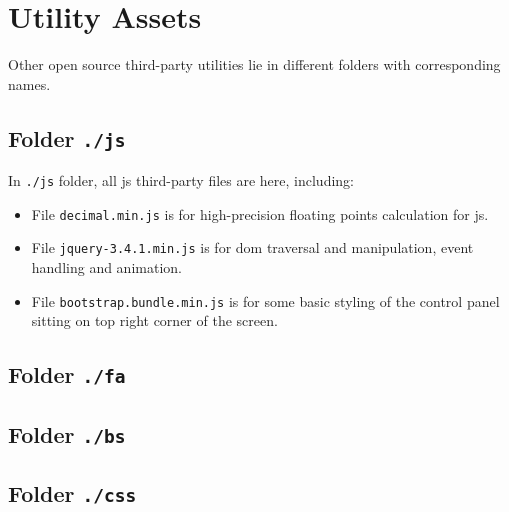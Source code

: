 \section{Utility Assets}

Other open source third-party utilities lie in different folders with corresponding names.

\subsection{Folder \texttt{./js}}

In \texttt{./js} folder, all \gls{js} third-party files are here, including:

\begin{itemize}
    \item File \texttt{decimal.min.js} is for high-precision floating points calculation for \glsdesc{js}.
    \item File \texttt{jquery-3.4.1.min.js} is for \gls{dom} traversal and manipulation, event handling and animation.
    \item File \texttt{bootstrap.bundle.min.js} is for some basic styling of the control panel sitting on top right corner of the screen.
\end{itemize}

\subsection{Folder \texttt{./fa}}

\subsection{Folder \texttt{./bs}}

\subsection{Folder \texttt{./css}}